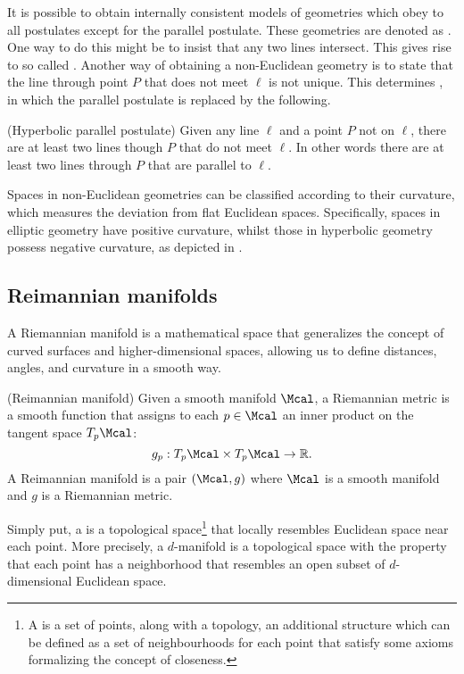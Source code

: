 It is possible to obtain internally consistent models of geometries which obey to all postulates except for the parallel postulate. These geometries are denoted as . One way to do this might be to insist that any two lines intersect. This gives rise to so called . Another way of obtaining a non-Euclidean geometry is to state that the line through point $P$ that does not meet $\ell$ is not unique. This determines , in which the parallel postulate is replaced by the following.


\begin{postulate}(Hyperbolic parallel postulate)
    Given any line $\ell$ and a point $P$ not on $\ell$, there are at least two lines though $P$ that do not meet $\ell$. In other words there are at least two lines through $P$ that are parallel to $\ell$.
\end{postulate}



Spaces in non-Euclidean geometries can be classified according to their curvature, which measures the deviation from flat Euclidean spaces. Specifically, spaces in elliptic geometry have positive curvature, whilst those in hyperbolic geometry possess negative curvature, as depicted in . 

\subsection{Reimannian manifolds}
A Riemannian manifold is a mathematical space that generalizes the concept of curved surfaces and higher-dimensional spaces, allowing us to define distances, angles, and curvature in a smooth way. 

\begin{definition} (Reimannian manifold)
Given a smooth manifold $\Mcal$, a Riemannian metric is a smooth function that assigns to each $p \in \Mcal$ an inner product on the tangent space $T_p\Mcal$:
\begin{equation*}
    g_p: T_p\Mcal \times T_p\Mcal \to \R.
\end{equation*}
    A Reimannian manifold is a pair $(\Mcal,g)$ where $\Mcal$ is a smooth manifold and $g$ is a Riemannian metric.
\end{definition}

Simply put, a  is a topological space\footnote{A  is a set of points, along with a topology, an additional structure which can be defined as a set of neighbourhoods for each point that satisfy some axioms formalizing the concept of closeness.} that locally resembles Euclidean space near each point. More precisely, a $d$-manifold  is a topological space with the property that each point has a neighborhood that resembles an open subset of $d$-dimensional Euclidean space. 

